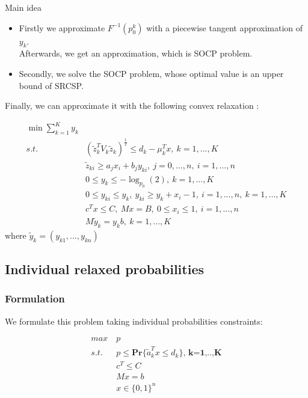 \documentclass{beamer}
\begin{document}
\begin{frame}
	\begin{block}{Main idea}
		\begin{itemize}
			\pause
			\item Firstly we approximate $F^{-1}(p_0^{k})$ with a piecewise tangent approximation of $y_k$. \\
			Afterwards, we get an approximation, which is SOCP problem.
			\pause
			\item Secondly, we solve the SOCP problem, whose optimal value is an upper bound
			of SRCSP.
		\end{itemize}
	\end{block}
\end{frame}

\begin{frame}
	Finally, we can approximate it with the following convex relaxation :

\begin{align*}
\min{\sum_{k=1}^K{y_k}}\\
 s.t.\ & (\tilde{z}_k^TV_k\tilde{z}_k)^\frac{1}{2} \leq d_k - \mu_k^Tx,\ k=1, ..., K \\
	& \tilde{z}_{ki} \geq a_jx_i +b_jy_{ki},\ j = 0, ..., n,\ i = 1, ..., n \\
	& 0 \leq y_k \leq - \log_{p_0}{(2)},\ k = 1, ..., K \\
	& 0 \leq y_{ki} \leq y_k,\ y_{ki} \geq y_k + x_i - 1,\ i =  1, ..., n,\ k = 1, ..., K \\
	& c^Tx \leq C,\ Mx = B,\ 0 \leq x_i \leq 1,\ i=1, ..., n  \\
	& M\tilde{y}_k = y_kb,\ k = 1, ..., K
\end{align*}
where $\tilde{y}_k = (y_{k1} , . . . , y_{kn})$
\end{frame}


\subsection{Individual relaxed probabilities}
\subsubsection{Formulation}
\begin{frame}
	We formulate this problem taking individual probabilities constraints:
	
\begin{align*}
 max\ & p\\
 s.t.\ & p \leq \mathbf{Pr} \{ \tilde{a}_k^Tx \leq d_k \}\textbf{,\ k=1,..,K} \\
 & c^T \leq C \\
 & Mx = b \\
 & x \in \{0, 1\}^n
\end{align*}
\end{frame}
\end{document}
